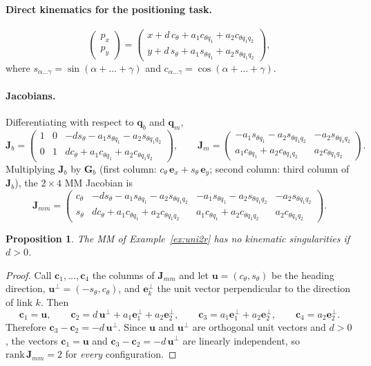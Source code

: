 \documentclass[11pt,a4paper]{article}
\newcommand{\qbase}{\bm{q}_b}
\newcommand{\qarm}{\bm{q}_m}
\newcommand{\Gbase}{\bm{G}_b}
\newcommand{\Jbase}{\bm{J}_b}
\newcommand{\Jarm}{\bm{J}_m}
\newcommand{\Jmm}{\bm{J}_{mm}}
\theoremstyle{plain}
\newtheorem{proposition}[theorem]{Proposition}
\theoremstyle{definition}
\theoremstyle{remark}
\begin{document}
\paragraph{Direct kinematics for the positioning task.}
\[
\begin{pmatrix}p_x\\ p_y\end{pmatrix}=
\begin{pmatrix}x+d\,c_\theta+a_1c_{\theta q_1}+a_2c_{\theta q_1q_2}\\[2pt]
y+d\,s_\theta+a_1s_{\theta q_1}+a_2s_{\theta q_1q_2}\end{pmatrix},
\]
where $s_{\alpha\dots\gamma}=\sin(\alpha+\dots+\gamma)$ and $c_{\alpha\dots\gamma}=\cos(\alpha+\dots+\gamma)$.

\paragraph{Jacobians.} Differentiating with respect to $\qbase$ and $\qarm$,
\[
\Jbase=\begin{pmatrix}1&0&-d s_\theta-a_1s_{\theta q_1}-a_2s_{\theta q_1q_2}\\
0&1&d c_\theta+a_1c_{\theta q_1}+a_2c_{\theta q_1q_2}\end{pmatrix},\qquad
\Jarm=\begin{pmatrix}-a_1s_{\theta q_1}-a_2s_{\theta q_1q_2}&-a_2s_{\theta q_1q_2}\\
a_1c_{\theta q_1}+a_2c_{\theta q_1q_2}&a_2c_{\theta q_1q_2}\end{pmatrix}.
\]
Multiplying $\Jbase$ by $\Gbase$ (first column: $c_\theta\,\bm e_x+s_\theta\,\bm e_y$; second column: third column of $\Jbase$), the $2\times4$ MM Jacobian is
\[
\Jmm=\begin{pmatrix}
c_\theta & -d s_\theta-a_1s_{\theta q_1}-a_2s_{\theta q_1q_2} & -a_1s_{\theta q_1}-a_2s_{\theta q_1q_2} & -a_2s_{\theta q_1q_2}\\
s_\theta & d c_\theta+a_1c_{\theta q_1}+a_2c_{\theta q_1q_2} & a_1c_{\theta q_1}+a_2c_{\theta q_1q_2} & a_2c_{\theta q_1q_2}
\end{pmatrix}.
\]

\begin{proposition}\label{prop:nosing}
The MM of Example~\ref{ex:uni2r} has no kinematic singularities if $d>0$.
\end{proposition}

\begin{proof}
Call $\bm c_1,\dots,\bm c_4$ the columns of $\Jmm$ and let $\bm u=(c_\theta,s_\theta)$ be the heading direction, $\bm u^\perp=(-s_\theta,c_\theta)$, and $\bm e_k^\perp$ the unit vector perpendicular to the direction of link $k$. Then
\[
\bm c_1=\bm u,\qquad
\bm c_2=d\,\bm u^\perp+a_1\bm e_1^\perp+a_2\bm e_2^\perp,\qquad
\bm c_3=a_1\bm e_1^\perp+a_2\bm e_2^\perp,\qquad
\bm c_4=a_2\bm e_2^\perp .
\]
Therefore $\bm c_3-\bm c_2=-d\,\bm u^\perp$. Since $\bm u$ and $\bm u^\perp$ are orthogonal unit vectors and $d>0$, the vectors $\bm c_1=\bm u$ and $\bm c_3-\bm c_2=-d\,\bm u^\perp$ are linearly independent, so $\mathrm{rank}\,\Jmm=2$ for \emph{every} configuration.
\end{proof}
\end{document}

